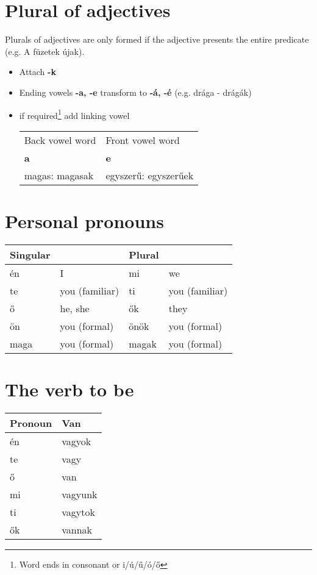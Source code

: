 \documentclass{article}
\begin{document}
\section{Plural of adjectives}
Plurals of adjectives are only formed if the adjective presents the entire predicate (e.g. A füzetek újak).
\begin{itemize}
\item Attach \textbf{-k}
\item Ending vowels \textbf{-a, -e} transform to \textbf{-á, -é} (e.g. drága - drágák)
\item if required\footnote{Word ends in consonant or i/ú/ű/ó/ő} add linking vowel \\
\begin{tabularx} {\textwidth}{ X X } \toprule
	Back vowel word & Front vowel word \\ 
	\textbf{a} & \textbf{e} \\ \midrule
	magas: magasak & egyszerű: egyszerűek \\ \bottomrule
\end{tabularx}
\end{itemize}

\section{Personal pronouns}
\begin{tabularx} {\textwidth}{ X X X X } \toprule
	Singular & & Plural  &  \\ \midrule 
	én & I & mi & we \\
	te & you (familiar) & ti & you (familiar) \\ 
	ő & he, she & ők & they \\
	ön & you (formal) & önök & you (formal) \\
	maga & you (formal) & magak & you (formal) \\ \bottomrule
\end{tabularx}

\section{The verb to be}
\begin{tabularx} {\textwidth}{ X X } \toprule
	Pronoun & Van  \\ \midrule 
	 én & vagyok \\
	 te & vagy \\
	 ő & van \\
	 mi & vagyunk \\
	 ti & vagytok \\
	 ők & vannak \\ \bottomrule
\end{tabularx}
\end{document}
